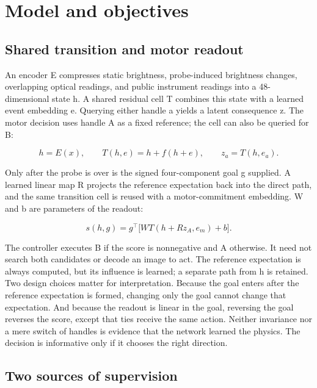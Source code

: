 \documentclass[11pt]{article}
\begin{document}
\FloatBarrier\section{Model and objectives}

\subsection{Shared transition and motor readout}

An encoder E compresses static brightness, probe-induced brightness changes, overlapping optical readings, and public instrument readings into a 48-dimensional state h. A shared residual cell T combines this state with a learned event embedding e. Querying either handle a yields a latent consequence z. The motor decision uses handle A as a fixed reference; the cell can also be queried for B:

\begin{equation*}
h=E(x),\qquad T(h,e)=h+f(h+e),\qquad z_a=T(h,e_a).\tag{2}
\end{equation*}

Only after the probe is over is the signed four-component goal g supplied. A learned linear map R projects the reference expectation back into the direct path, and the same transition cell is reused with a motor-commitment embedding. W and b are parameters of the readout:

\begin{equation*}
s(h,g)=g^\top \big[ W T(h+Rz_A,e_m)+b \big].\tag{3}
\end{equation*}

The controller executes B if the score is nonnegative and A otherwise. It need not search both candidates or decode an image to act. The reference expectation is always computed, but its influence is learned; a separate path from h is retained. Two design choices matter for interpretation. Because the goal enters after the reference expectation is formed, changing only the goal cannot change that expectation. And because the readout is linear in the goal, reversing the goal reverses the score, except that ties receive the same action. Neither invariance nor a mere switch of handles is evidence that the network learned the physics. The decision is informative only if it chooses the right direction.

\subsection{Two sources of supervision}
\end{document}
